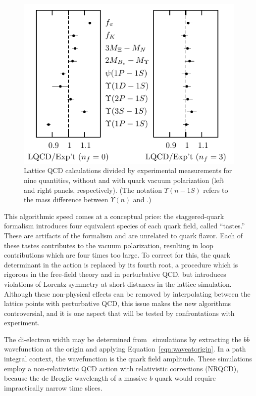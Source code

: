 \documentclass{cornell}
\begin{document}
\begin{figure}[p]
  \begin{center}
    \includegraphics[width=\linewidth]{plots/latticevictory}
  \end{center}
  \caption[Lattice QCD results with and without vacuum
  polarization]{\label{latticevictory} Lattice QCD calculations
  divided by experimental measurements for nine quantities, without
  and with quark vacuum polarization (left and right panels,
  respectively).  (The notation $\Upsilon(n - 1S)$ refers to the mass
  difference between $\Upsilon(n)$ and \us.)}
\end{figure}

This algorithmic speed comes at a conceptual price: the
staggered-quark formalism introduces four equivalent species of each
quark field, called ``tastes.''  These are artifacts of the formalism
and are unrelated to quark flavor.  Each of these tastes contributes
to the vacuum polarization, resulting in loop contributions which are
four times too large.  To correct for this, the quark determinant in
the action is replaced by its fourth root, a procedure which is
rigorous in the free-field theory and in perturbative QCD, but
introduces violations of Lorentz symmetry at short distances in the
lattice simulation.  Although these non-physical effects can be
removed by interpolating between the lattice points with perturbative
QCD, this issue makes the new algorithms controversial, and it is one
aspect that will be tested by confrontations with experiment.

The di-electron width may be determined from \ups\ simulations by
extracting the $b\bar{b}$ wavefunction at the origin and applying
Equation~\ref{eqn:waveatorigin}.  In a path integral context, the
wavefunction is the quark field amplitude.  These simulations employ a
non-relativistic QCD action with relativistic corrections (NRQCD),
because the de Broglie wavelength of a massive $b$ quark would require
impractically narrow time slices.
\end{document}
